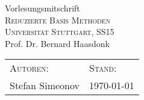 
\usepackage{mathtools}
\usepackage{pgfplots}



\begin{center}
	Vorlesungsmitschrift\\
	\huge \textsc{Reduzierte Basis Methoden}\\[0.5cm]
	\large \textsc{Universität Stuttgart, SS15}\\
	Prof. Dr. Bernard Haasdonk\\[0.2cm]
\end{center}

\vspace{\baselineskip}

\begin{tabularx}{0.9\textwidth}{Xl}
	\small \textsc{Autoren}: & \textsc{Stand}:\\
	Stefan Simeonov & \today 
\end{tabularx}

\vspace{2\baselineskip}

\tableofcontents

\pagebreak


\newpage

\newpage

 

